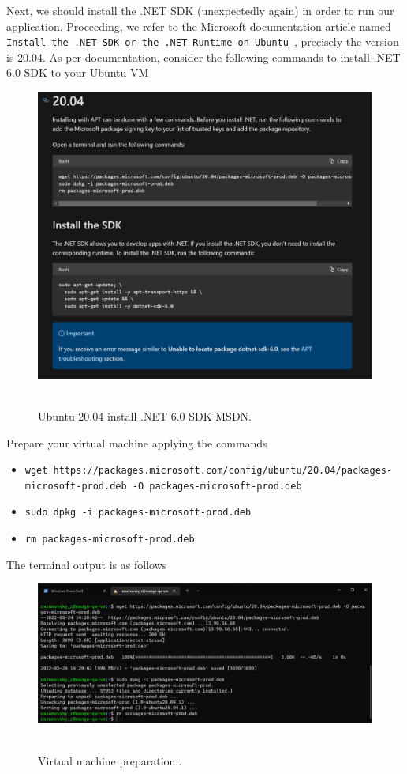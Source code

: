 Next, we should install the .NET SDK (unexpectedly again) in order to run our application.
Proceeding, we refer to the Microsoft documentation article named
\href{https://docs.microsoft.com/en-us/dotnet/core/install/linux-ubuntu}
{\texttt{Install the .NET SDK or the .NET Runtime on Ubuntu}}~\cite{MSDN_Ubuntu}, precisely the version is 20.04.
As per documentation, consider the following commands to install .NET 6.0 SDK to your Ubuntu VM
\begin{figure}[H]
    \centering
    \includegraphics[width=1\textwidth]{img/03_1_sdk_documentation}
    ~\caption{Ubuntu 20.04 install .NET 6.0 SDK MSDN.}\label{fig:figure2}
\end{figure}
Prepare your virtual machine applying the commands
\begin{itemize}
    \item \texttt{wget https://packages.microsoft.com/config/ubuntu/20.04/packages-microsoft-prod.deb -O packages-microsoft-prod.deb}
    \item \texttt{sudo dpkg -i packages-microsoft-prod.deb}
    \item \texttt{rm packages-microsoft-prod.deb}
\end{itemize}
The terminal output is as follows
\begin{figure}[H]
    \centering
    \includegraphics[width=1\textwidth]{img/03_3_vm_prepare}
    ~\caption{Virtual machine preparation..}\label{fig:figure3}
\end{figure}
